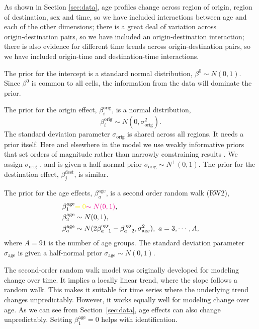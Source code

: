 \documentclass{article}
\begin{document}
As shown in Section \ref{sec:data}, 
age profiles change across region of origin, region of destination, sex and time, so we have included interactions between age and each of the other dimensions; 
there is a great deal of variation across origin‑destination pairs, so we have included an origin‑destination interaction; there is also evidence for different time trends across origin-destination pairs, so we have included origin-time and destination-time interactions.

The prior for the intercept is a standard normal distribution,
$\beta^0\sim N(0,1)$. Since $\beta^0$ is common to all cells,  the information from the data will dominate the prior.

The prior for the origin effect, $\beta_i^{\text{orig}}$, is a normal distribution,
\begin{equation}
\beta_i^{\text{orig}}\sim N(0,\sigma_{\text{orig}}^2).
\end{equation}
The standard deviation parameter $\sigma_{\text{orig}}$ is shared across all regions.  {\color{magenta}It needs a prior itself. Here and elsewhere in the model we use weakly informative priors that set orders of magnitude rather than narrowly constraining results \citep[p. 55]{Gelman2014bayesian}. We assign $\sigma_{\text{orig}}$}
{\color{yellow}, and is given} a half-normal prior
$\sigma_{\text{orig}}\sim N^+(0,1).$ 
The prior for the destination effect, $\beta_j^{\text{dest}}$, is similar.

The prior for the age effects, $\beta_a^{\text{age}}$, is a second order random walk (RW2),
\begin{equation}
\begin{aligned}
\beta_1^{\text{age}}&{\color{yellow}=0}{\color{magenta}\sim N(0,1)},\\
\beta_2^{\text{age}}&\sim N(0,1),\\
\beta_a^{\text{age}}&\sim N(2\beta_{a-1}^{\text{age}}-\beta_{a-2}^{\text{age}},\sigma_{\text{age}}^2),\ a=3,\cdots,A,
\end{aligned}
\end{equation}
where $A=91$ is the number of age groups.
The standard deviation parameter $\sigma_{\text{age}}$ is given a half-normal prior $\sigma_{\text{age}}\sim N(0,1).$

The second-order random walk model was originally developed for modeling change over time. It implies a locally linear trend, where the slope  follows a random walk. This makes it suitable for time series where the underlying trend changes unpredictably. However, it works equally well for modeling change over age. As we can see from Section~\ref{sec:data}, age effects can also change unpredictably. {\color{yellow}Setting $\beta_1^{\text{age}}=0$ helps with identification.}
\end{document}
